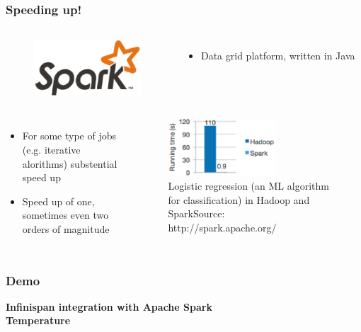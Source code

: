 \documentclass[10pt,utf8]{beamer}
\begin{document}
\begin{frame}
	\frametitle{Speeding up!}
	\begin{columns}
		\begin{figure}
			\centering
			\includegraphics[width=4cm]{./img/spark-logo.eps}
		\end{figure}
		\begin{itemize}
			\item Data grid platform, written in Java
		\end{itemize}
	\end{columns}

	\begin{columns}
	\column{0.6\textwidth}
		\begin{itemize}
			\item For some type of jobs (e.g. iterative alorithms) substential speed up
			\item Speed up of one, sometimes even two orders of magnitude
		\end{itemize}
	\column{0.38\textwidth}
	  \begin{figure}
			\centering
			\includegraphics[width=4cm]{./img/hadoop_vs_spark.eps}
			\caption{\tiny{Logistic regression (an ML algorithm for classification) in Hadoop and Spark\newline Source: http://spark.apache.org/}}
		\end{figure}
	\end{columns}
\end{frame}
	


\begin{frame}
	\frametitle{Demo}
	\textbf{Infinispan integration with Apache Spark} \\
	\small{\textbf{Temperature}}
\end{frame}
\end{document}
